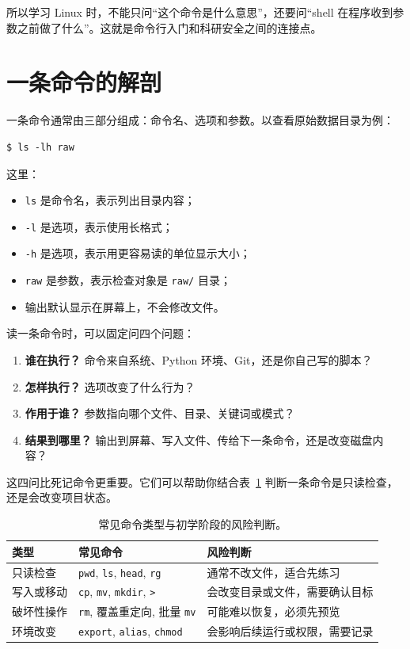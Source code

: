 所以学习 Linux 时，不能只问“这个命令是什么意思”，还要问“shell 在程序收到参数之前做了什么”。这就是命令行入门和科研安全之间的连接点。

\section{一条命令的解剖}

一条命令通常由三部分组成：命令名、选项和参数。以查看原始数据目录为例：

\begin{examplebox}[命令的基本结构]
\begin{lstlisting}[style=terminal]
$ ls -lh raw
\end{lstlisting}
\end{examplebox}

这里：

\begin{itemize}
    \item \texttt{ls} 是命令名，表示列出目录内容；
    \item \texttt{-l} 是选项，表示使用长格式；
    \item \texttt{-h} 是选项，表示用更容易读的单位显示大小；
    \item \texttt{raw} 是参数，表示检查对象是 \texttt{raw/} 目录；
    \item 输出默认显示在屏幕上，不会修改文件。
\end{itemize}

读一条命令时，可以固定问四个问题：

\begin{enumerate}
    \item \textbf{谁在执行？} 命令来自系统、Python 环境、Git，还是你自己写的脚本？
    \item \textbf{怎样执行？} 选项改变了什么行为？
    \item \textbf{作用于谁？} 参数指向哪个文件、目录、关键词或模式？
    \item \textbf{结果到哪里？} 输出到屏幕、写入文件、传给下一条命令，还是改变磁盘内容？
\end{enumerate}

这四问比死记命令更重要。它们可以帮助你结合表~\ref{tab:ch01_command_risk} 判断一条命令是只读检查，还是会改变项目状态。

\begin{table}[htbp]
\centering
\begin{tabular}{p{}p{}p{}}
\toprule
类型 & 常见命令 & 风险判断 \\
\midrule
只读检查 & \texttt{pwd}, \texttt{ls}, \texttt{head}, \texttt{rg} & 通常不改文件，适合先练习 \\
写入或移动 & \texttt{cp}, \texttt{mv}, \texttt{mkdir}, \texttt{>} & 会改变目录或文件，需要确认目标 \\
破坏性操作 & \texttt{rm}, 覆盖重定向, 批量 \texttt{mv} & 可能难以恢复，必须先预览 \\
环境改变 & \texttt{export}, \texttt{alias}, \texttt{chmod} & 会影响后续运行或权限，需要记录 \\
\bottomrule
\end{tabular}
\caption{常见命令类型与初学阶段的风险判断。}
\label{tab:ch01_command_risk}
\end{table}

